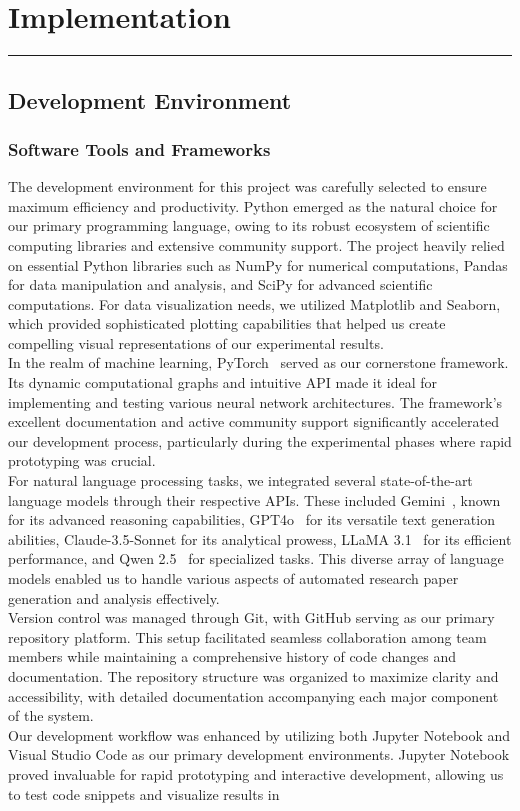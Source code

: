 \chapter{Implementation}
\vspace{-1.5cm}
\hspace{-1cm}\rule{19cm}{0.4pt} 

\section{Development Environment}
\subsection{Software Tools and Frameworks}
The development environment for this project was carefully selected to ensure maximum efficiency and productivity. Python emerged as the natural choice for our primary programming language, owing to its robust ecosystem of scientific computing libraries and extensive community support. The project heavily relied on essential Python libraries such as NumPy for numerical computations, Pandas for data manipulation and analysis, and SciPy for advanced scientific computations. For data visualization needs, we utilized Matplotlib and Seaborn, which provided sophisticated plotting capabilities that helped us create compelling visual representations of our experimental results.\\In the realm of machine learning, PyTorch~\cite{Paszke2019PyTorch} served as our cornerstone framework. Its dynamic computational graphs and intuitive API made it ideal for implementing and testing various neural network architectures. The framework's excellent documentation and active community support significantly accelerated our development process, particularly during the experimental phases where rapid prototyping was crucial.\\For natural language processing tasks, we integrated several state-of-the-art language models through their respective APIs. These included Gemini~\cite{2023arXiv231211805G}, known for its advanced reasoning capabilities, GPT4o~\cite{openai2023} for its versatile text generation abilities, Claude-3.5-Sonnet for its analytical prowess, LLaMA 3.1~\cite{llama2023} for its efficient performance, and Qwen 2.5~\cite{qwen2.5} for specialized tasks. This diverse array of language models enabled us to handle various aspects of automated research paper generation and analysis effectively.\\Version control was managed through Git, with GitHub serving as our primary repository platform. This setup facilitated seamless collaboration among team members while maintaining a comprehensive history of code changes and documentation. The repository structure was organized to maximize clarity and accessibility, with detailed documentation accompanying each major component of the system.\\Our development workflow was enhanced by utilizing both Jupyter Notebook and Visual Studio Code as our primary development environments. Jupyter Notebook proved invaluable for rapid prototyping and interactive development, allowing us to test code snippets and visualize results in 